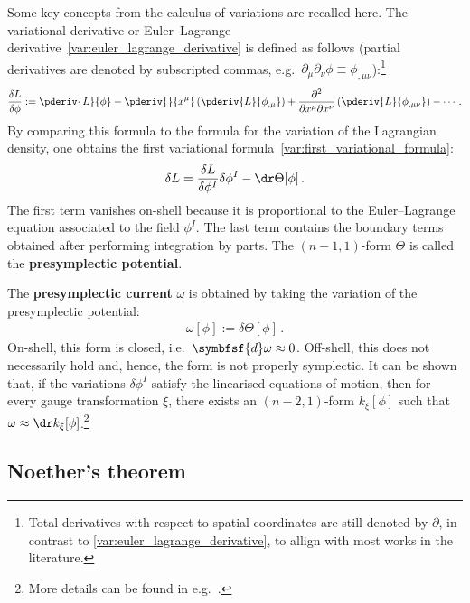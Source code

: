     Some key concepts from the calculus of variations are recalled here. The variational derivative or Euler--Lagrange derivative~\eqref{var:euler_lagrange_derivative} is defined as follows (partial derivatives are denoted by subscripted commas, e.g.~$\partial_\mu\partial_\nu\phi\equiv\phi_{,\mu\nu}$):\footnote{Total derivatives with respect to spatial coordinates are still denoted by $\partial$, in contrast to \cref{var:euler_lagrange_derivative}, to allign with most works in the literature.}
    \begin{gather}
        \frac{\delta L}{\delta \phi} := \pderiv{L}{\phi} - \pderiv{}{x^\mu}\left(\pderiv{L}{\phi_{,\mu}}\right) + \frac{\partial^2}{\partial x^\mu\partial x^\nu}\left(\pderiv{L}{\phi_{,\mu\nu}}\right) -\cdots\,.
    \end{gather}
    By comparing this formula to the formula for the variation of the Lagrangian density, one obtains the first variational formula~\eqref{var:first_variational_formula}:
    \begin{gather}
        \delta L = \frac{\delta L}{\delta\phi^I}\delta\phi^I - \dr\Theta[\phi]\,.
    \end{gather}
    The first term vanishes on-shell because it is proportional to the Euler--Lagrange equation associated to the field $\phi^I$. The last term contains the boundary terms obtained after performing integration by parts. The $(n-1,1)$-form $\Theta$ is called the \textbf{presymplectic potential}.

    The \textbf{presymplectic current} $\omega$ is obtained by taking the variation of the presymplectic potential:
    \begin{gather}
        \omega[\phi] := \delta\Theta[\phi]\,.
    \end{gather}
    On-shell, this form is closed, i.e.~$\symbfsf{d}\omega\approx0$. Off-shell, this does not necessarily hold and, hence, the form is not properly symplectic. It can be shown that, if the variations $\delta\phi^I$ satisfy the linearised equations of motion, then for every gauge transformation $\xi$, there exists an $(n-2,1)$-form $k_\xi[\phi]$ such that $\omega\approx\dr k_\xi[\phi]$.\footnote{More details can be found in e.g.~\citet{compere_advanced_2019}.}


\subsection{Noether's theorem}

